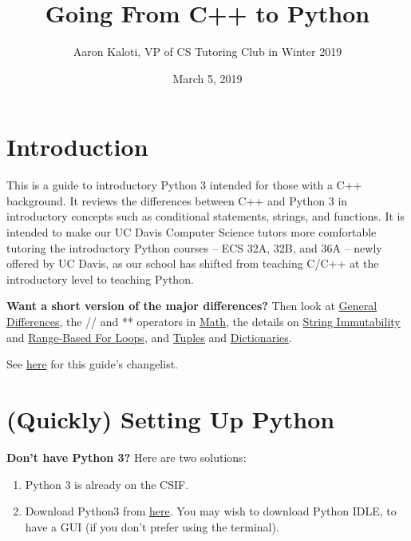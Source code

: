 \documentclass{article}
\title{Going From C++ to Python}
\author{Aaron Kaloti, VP of CS Tutoring Club in Winter 2019}
\date{March 5, 2019}
\begin{document}
\maketitle
\tableofcontents

\section{Introduction}

This is a guide to introductory Python 3 intended for those with a C++ background. It reviews the differences between C++ and Python 3 in introductory concepts such as conditional statements, strings, and functions. It is intended to make our UC Davis Computer Science tutors more comfortable tutoring the introductory Python courses -- ECS 32A, 32B, and 36A -- newly offered by UC Davis, as our school has shifted from teaching C/C++ at the introductory level to teaching Python.

\textbf{Want a short version of the major differences?} Then look at \hyperref[sec:general-differences]{General Differences}, the // and ** operators in \hyperref[sec:numbers-and-arithmetic]{Math}, the details on \hyperref[sec:strings-immutability]{String Immutability} and \hyperref[sec:range-based-for-loop]{Range-Based For Loops}, and \hyperref[sec:tuples]{Tuples} and \hyperref[sec:dictionaries]{Dictionaries}.

See \href{https://github.com/aaronistheman/UCD-Intro-Python-Guide/commits/master}{here} for this guide's changelist.

\section{(Quickly) Setting Up Python}
\textbf{Don't have Python 3?} Here are two solutions:
\begin{enumerate}
    \item Python 3 is already on the CSIF.
    \item Download Python3 from \href{https://www.python.org/downloads/}{here}. You may wish to download Python IDLE, to have a GUI (if you don't prefer using the terminal). 
\end{enumerate}
\end{document}
